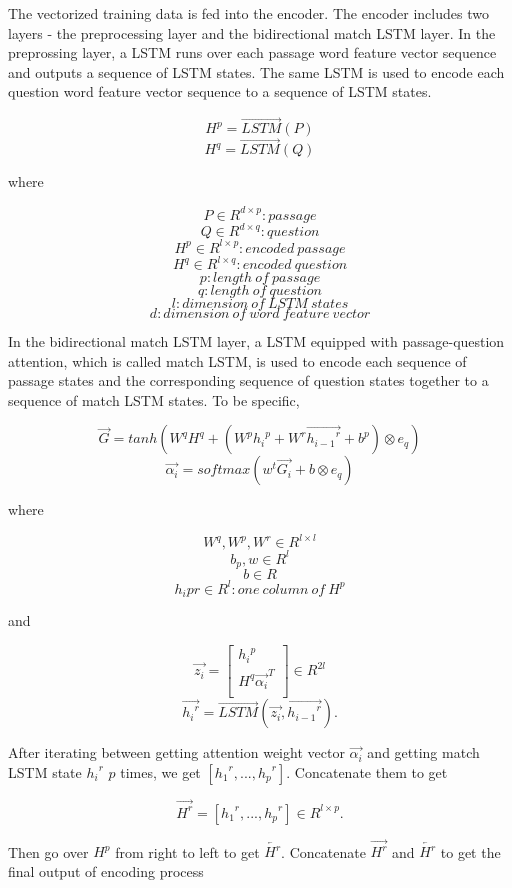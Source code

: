 \documentclass[modernstyle,12pt]{sjsuthesis}
\theoremstyle{definition}
\begin{document}
The vectorized training data is fed into the encoder. The encoder includes two layers - the preprocessing layer and the bidirectional match LSTM layer. In the preprossing layer, a LSTM runs over each passage word feature vector sequence and outputs a sequence of LSTM states. The same LSTM is used to encode each question word feature vector sequence to a sequence of LSTM states.

$$H^p = \overrightarrow{LSTM}(P)$$
$$H^q = \overrightarrow{LSTM}(Q)$$

where

 $$P\in R^{d \times p}: passage$$
 $$Q\in R^{d \times q}: question$$
 $$H^p\in R^{l \times p}: encoded\ passage$$
 $$H^q\in R^{l \times q}: encoded\ question$$
 $$p: length \ of\ passage$$
 $$q: length\ of\ question$$
 $$l: dimension\ of\ LSTM\ states$$
 $$d: dimension\ of\ word\ feature\ vector$$

In the bidirectional match LSTM layer, a LSTM equipped with passage-question attention, which is called match LSTM, is used to encode each sequence of passage states and the corresponding sequence of question states together to a sequence of match LSTM states. To be specific,

$$\overrightarrow{G} = tanh(W^qH^q + (W^p{h_i}^p + W^r\overrightarrow{{h_{i-1}}^r} + b^p) \otimes e_q)$$
$$\overrightarrow{\alpha _i} = softmax(w^t\overrightarrow{G_i} + b \otimes e_q)$$


where

$$W^q, W^p, W^r\in R^{l \times l} $$
$$b_p, w\in R^{l}  $$
$$b \in R $$
$${{h_{i}}pr}\in R^{l}: one\ column\ of\ H^p  $$

and

\[ \overrightarrow{z_i} =
\begin{bmatrix}
{h_i}^p \\
H^q\overrightarrow{ {\alpha _i}}^T \\
\end{bmatrix}
\in R^{2l}
\]
$$\overrightarrow{{h_i}^r} = \overrightarrow{LSTM}(\overrightarrow{z_i}, \overrightarrow{{h_{i-1}}^r}).$$

After iterating between getting attention weight vector $\overrightarrow{\alpha _i}$ and getting match LSTM state ${{h_{i}}^r}$ $p$ times, we get $[{{h_{1}}^r}, ..., {{h_{p}}^r}]$. Concatenate them to get

$$\overrightarrow{H^r} = [{{h_{1}}^r}, ..., {{h_{p}}^r}] \in R^{l \times p}.$$

Then go over $H^p$ from right to left to get $\overleftarrow{H^r}$. Concatenate $\overrightarrow{H^r}$ and $\overleftarrow{H^r}$ to get the final output of encoding process
\end{document}
